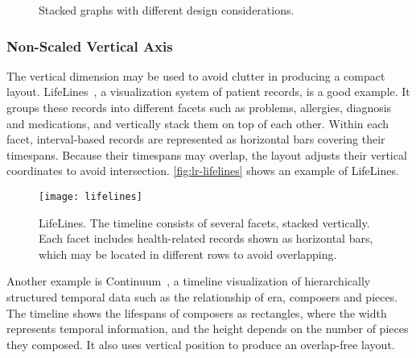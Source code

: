 \begin{figure}[!htb]
\centering
{}

\vspace{0.5cm}


\vspace{0.5cm}

\caption{Stacked graphs with different design considerations. }
\label{fig:lr-streamgraph}
\end{figure}

\subsubsection{Non-Scaled Vertical Axis}
The vertical dimension may be used to avoid clutter in producing a compact layout. LifeLines~\cite{Plaisant1996,Plaisant1998}, a visualization system of patient records, is a good example. It groups these records into different facets such as problems, allergies, diagnosis and medications, and vertically stack them on top of each other. Within each facet, interval-based records are represented as horizontal bars covering their timespans. Because their timespans may overlap, the layout adjusts their vertical coordinates to avoid intersection. \autoref{fig:lr-lifelines} shows an example of LifeLines. 

\begin{figure}[!htb]
	\centering
	\texttt{[image: lifelines]}
	\caption{LifeLines. The timeline consists of several facets, stacked vertically. Each facet includes health-related records shown as horizontal bars, which may be located in different rows to avoid overlapping. }
	\label{fig:lr-lifelines}
\end{figure}

Another example is Continuum~\cite{Andre2007}, a timeline visualization of hierarchically structured temporal data such as the relationship of era, composers and pieces. The timeline shows the lifespans of composers as rectangles, where the width represents temporal information, and the height depends on the number of pieces they composed. It also uses vertical position to produce an overlap-free layout.

